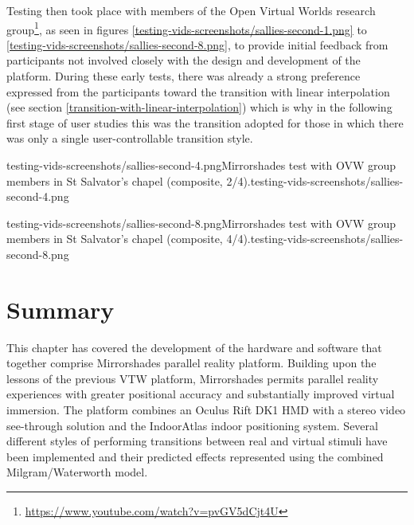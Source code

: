 Testing then took place with members of the Open Virtual Worlds research group\footnote{\url{https://www.youtube.com/watch?v=pvGV5dCjt4U}}, as seen in figures \ref{testing-vids-screenshots/sallies-second-1.png} to \ref{testing-vids-screenshots/sallies-second-8.png}, to provide initial feedback from participants not involved closely with the design and development of the platform. During these early tests, there was already a strong preference expressed from the participants toward the transition with linear interpolation (see section \ref{transition-with-linear-interpolation}) which is why in the following first stage of user studies this was the transition adopted for those in which there was only a single user-controllable transition style.

       {testing-vids-screenshots/sallies-second-4.png}{Mirrorshades test with OVW group members in St Salvator's chapel (composite, 2/4).}{testing-vids-screenshots/sallies-second-4.png}


       {testing-vids-screenshots/sallies-second-8.png}{Mirrorshades test with OVW group members in St Salvator's chapel (composite, 4/4).}{testing-vids-screenshots/sallies-second-8.png}


\section{Summary}
This chapter has covered the development of the hardware and software that together comprise Mirrorshades parallel reality platform. Building upon the lessons of the previous VTW platform, Mirrorshades permits parallel reality experiences with greater positional accuracy and substantially improved virtual immersion. The platform combines an Oculus Rift DK1 HMD with a stereo video see-through solution and the IndoorAtlas indoor positioning system. Several different styles of performing transitions between real and virtual stimuli have been implemented and their predicted effects represented using the combined Milgram/Waterworth model.

